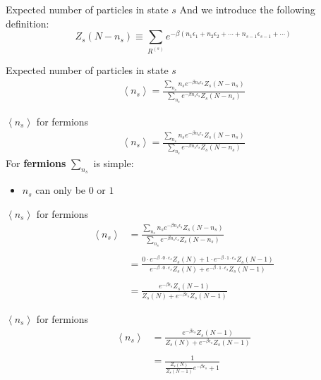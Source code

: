 \documentclass{beamer}
\begin{document}
\begin{frame}{Expected number of particles in state $s$}
	And we introduce the following definition:
	\begin{equation*}
		Z_s(N-n_s)\equiv\sum_{R^{(s)}}e^{-\beta\left(n_1\epsilon_1+n_2\epsilon_2+\cdots+n_{s-1}\epsilon_{s-1}+\cdots\right)}
	\end{equation*}
\end{frame}



\begin{frame}{Expected number of particles in state $s$}
	\begin{align*}
		\left<n_s\right>=\frac{\sum_{n_s}n_se^{-\beta n_s\epsilon_s}Z_s(N-n_s)}{\sum_{n_s}e^{-\beta n_s\epsilon_s}Z_s(N-n_s)}
	\end{align*}
\end{frame}




\begin{frame}{$\left<n_s\right>$ for fermions}
	\begin{align*}
		\left<n_s\right>=\frac{\sum_{n_s}n_se^{-\beta n_s\epsilon_s}Z_s(N-n_s)}{\sum_{n_s}e^{-\beta n_s\epsilon_s}Z_s(N-n_s)}
	\end{align*}
For \textbf{fermions} $\sum_{n_s}$ is simple:
\begin{itemize}
	\item $n_s$ can only be $0$ or $1$
\end{itemize}
\end{frame}




\begin{frame}{$\left<n_s\right>$ for fermions}
	\begin{align*}
		\left<n_s\right>&=\frac{\sum_{n_s}n_se^{-\beta n_s\epsilon_s}Z_s(N-n_s)}{\sum_{n_s}e^{-\beta n_s\epsilon_s}Z_s(N-n_s)}\\\\
		&=\frac{0\cdot e^{-\beta\cdot 0\cdot\epsilon_s}Z_s(N)+1\cdot e^{-\beta\cdot1\cdot\epsilon_s}Z_s(N-1)}{e^{-\beta\cdot0\cdot\epsilon_s}Z_s(N)+e^{-\beta\cdot1\cdot\epsilon_s}Z_s(N-1)}\\\\
		&=\frac{e^{-\beta\epsilon_s}Z_s(N-1)}{Z_s(N)+e^{-\beta\epsilon_s}Z_s(N-1)}
	\end{align*}
\end{frame}




\begin{frame}{$\left<n_s\right>$ for fermions}
	\begin{align*}
		\left<n_s\right>
		&=\frac{e^{-\beta\epsilon_s}Z_s(N-1)}{Z_s(N)+e^{-\beta\epsilon_s}Z_s(N-1)}\\\\
		&=\frac{1}{\frac{Z_s(N)}{Z_s(N-1)}e^{-\beta\epsilon_s}+1}
	\end{align*}
\end{frame}
\end{document}
